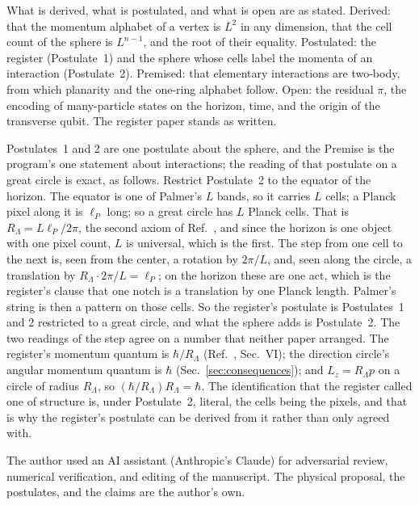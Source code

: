 \documentclass[aps,prd,twocolumn,superscriptaddress,nofootinbib]{revtex4-2}
\begin{document}
What is derived, what is postulated, and what is open are as stated. Derived: that the momentum alphabet of a vertex is $L^2$ in any dimension, that the cell count of the sphere is $L^{n-1}$, and the root of their equality. Postulated: the register (Postulate~1) and the sphere whose cells label the momenta of an interaction (Postulate~2). Premised: that elementary interactions are two-body, from which planarity and the one-ring alphabet follow. Open: the residual $\pi$, the encoding of many-particle states on the horizon, time, and the origin of the transverse qubit. The register paper stands as written.

Postulates~1 and 2 are one postulate about the sphere, and the Premise is the program's one statement about interactions; the reading of that postulate on a great circle is exact, as follows. Restrict Postulate~2 to the equator of the horizon. The equator is one of Palmer's $L$ bands, so it carries $L$ cells; a Planck pixel along it is $\ell_P$ long; so a great circle has $L$ Planck cells. That is $R_\Lambda = L\ell_P/2\pi$, the second axiom of Ref.~\cite{korytko2026}, and since the horizon is one object with one pixel count, $L$ is universal, which is the first. The step from one cell to the next is, seen from the center, a rotation by $2\pi/L$, and, seen along the circle, a translation by $R_\Lambda\cdot2\pi/L = \ell_P$; on the horizon these are one act, which is the register's clause that one notch is a translation by one Planck length. Palmer's string is then a pattern on those cells. So the register's postulate is Postulates~1 and 2 restricted to a great circle, and what the sphere adds is Postulate~2. The two readings of the step agree on a number that neither paper arranged. The register's momentum quantum is $\hbar/R_\Lambda$ (Ref.~\cite{korytko2026c}, Sec.~VI); the direction circle's angular momentum quantum is $\hbar$ (Sec.~\ref{sec:consequences}); and $L_z = R_\Lambda p$ on a circle of radius $R_\Lambda$, so $(\hbar/R_\Lambda)R_\Lambda = \hbar$. The identification that the register called one of structure is, under Postulate~2, literal, the cells being the pixels, and that is why the register's postulate can be derived from it rather than only agreed with.

\begin{acknowledgments}
The author used an AI assistant (Anthropic's Claude) for adversarial review, numerical verification, and editing of the manuscript. The physical proposal, the postulates, and the claims are the author's own.
\end{acknowledgments}
\end{document}
